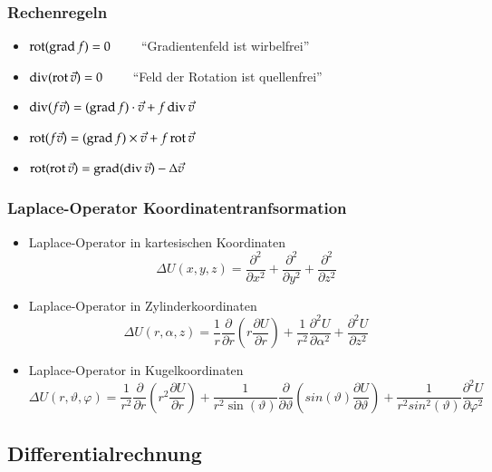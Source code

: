 \subsubsection{Rechenregeln}
\begin{itemize}
	\item $\operatorname{rot}(\operatorname{grad} f) = 0 \qquad $ ``Gradientenfeld ist wirbelfrei''
	\item $\operatorname{div}(\operatorname{rot} \vec{v}) = 0 \qquad $ ``Feld der Rotation ist quellenfrei''
	\item $\operatorname{div}(f\vec{v}) = (\operatorname{grad} f) \cdot \vec{v} + f \operatorname{div} \vec{v}$
	\item $\operatorname{rot}(f\vec{v}) = (\operatorname{grad} f) \times \vec{v} + f \operatorname{rot} \vec{v}$
	\item $\operatorname{rot}(\operatorname{rot} \vec{v}) = \operatorname{grad}(\operatorname{div} \vec{v}) - \Delta \vec{v}$
\end{itemize}
\subsubsection{Laplace-Operator Koordinatentranfsormation}
\begin{itemize}
	\item Laplace-Operator in kartesischen Koordinaten
	\[\Delta U(x,y,z) = \frac{\partial^{2}}{\partial x^{2}}+\frac{\partial^{2}}{\partial y^{2}}+\frac{\partial^{2}}{\partial z^{2}}\]
	\item Laplace-Operator in Zylinderkoordinaten
	\[\Delta U(r,\alpha,z) = \frac{1}{r} \dfrac{\partial}{\partial r} \left(r \frac{\partial U}{\partial r}\right) + \frac{1}{r^2}\frac{\partial^2 U}{\partial \alpha^2}+\dfrac{\partial^2 U}{\partial z^2} \]
	\item Laplace-Operator in Kugelkoordinaten
	\[\Delta U(r,\vartheta,\varphi) = \frac{1}{r^2} \dfrac{\partial}{\partial r} \left( r^2 \frac{\partial U}{\partial r}\right) + \frac{1}{r^2 \sin(\vartheta)}\frac{\partial}{\partial \vartheta}\left(sin(\vartheta)\dfrac{\partial U}{\partial \vartheta} \right) +\frac{1}{r^2 sin^2(\vartheta)}\dfrac{\partial^2 U}{\partial \varphi^2}\]
\end{itemize}
\subsection{Differentialrechnung}

